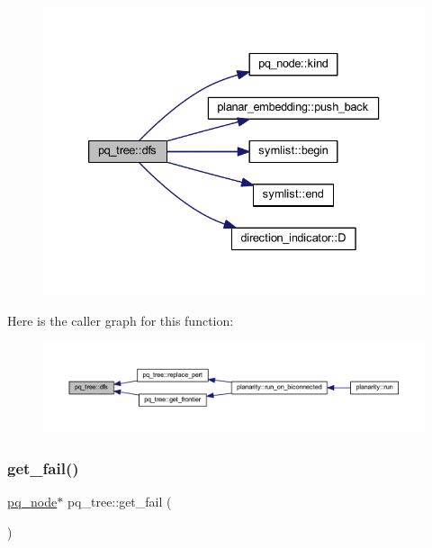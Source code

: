 \begin{figure}[H]
\begin{center}
\leavevmode
\includegraphics[width=333pt]{classpq__tree_a60d97d712c79b072693f75de3f0d328e_cgraph}
\end{center}
\end{figure}
Here is the caller graph for this function\+:\nopagebreak
\begin{figure}[H]
\begin{center}
\leavevmode
\includegraphics[width=350pt]{classpq__tree_a60d97d712c79b072693f75de3f0d328e_icgraph}
\end{center}
\end{figure}
\mbox{\label{classpq__tree_ad5788903c1411626e69e49aaa1b6541b}} 
\subsubsection{\texorpdfstring{get\+\_\+fail()}{get\_fail()}}
{\footnotesize\ttfamily \mbox{\hyperlink{classpq__node}{pq\+\_\+node}}$\ast$ pq\+\_\+tree\+::get\+\_\+fail (\begin{DoxyParamCaption}{ }\end{DoxyParamCaption})\hspace{0.3cm}{\ttfamily [inline]}}



